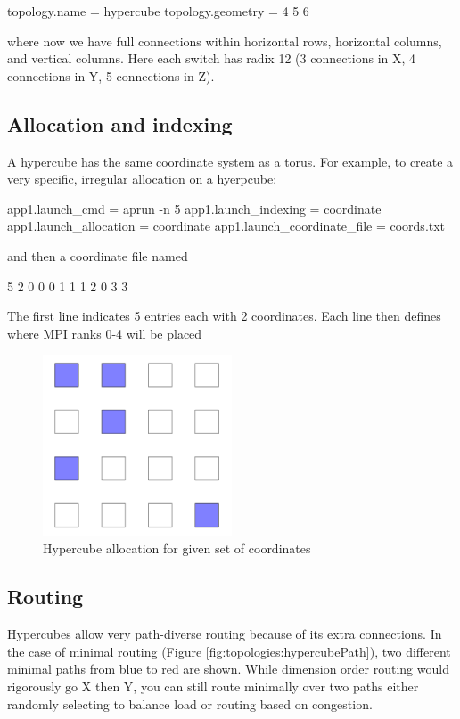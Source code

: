 \begin{ViFile}
topology.name = hypercube
topology.geometry = 4 5 6
\end{ViFile}

where now we have full connections within horizontal rows, horizontal columns, and vertical columns.
Here each switch has radix 12 (3 connections in X, 4 connections in Y, 5 connections in Z). 

\subsection{Allocation and indexing}
A hypercube has the same coordinate system as a torus. For example, to create a very specific, irregular allocation on a hyerpcube:

\begin{ViFile}
app1.launch_cmd = aprun -n 5
app1.launch_indexing = coordinate
app1.launch_allocation = coordinate
app1.launch_coordinate_file = coords.txt
\end{ViFile}

and then a coordinate file named 
\begin{ViFile}
5 2
0 0
0 1
1 1
2 0
3 3
\end{ViFile}
The first line indicates 5 entries each with 2 coordinates.
Each line then defines where MPI ranks 0-4 will be placed

\begin{figure}[h!]
\centering
\includegraphics[width=0.5\textwidth]{figures/tikz/hypercube/hypercube_allocation.png}
\caption{Hypercube allocation for given set of coordinates}
\label{fig:topologies:hypercubeAllocation}
\end{figure}

\subsection{Routing}
Hypercubes allow very path-diverse routing because of its extra connections.
In the case of minimal routing (Figure \ref{fig:topologies:hypercubePath}), two different minimal paths from blue to red are shown.
While dimension order routing would rigorously go X then Y, you can still route minimally over two paths either randomly selecting to balance load or routing based on congestion.

